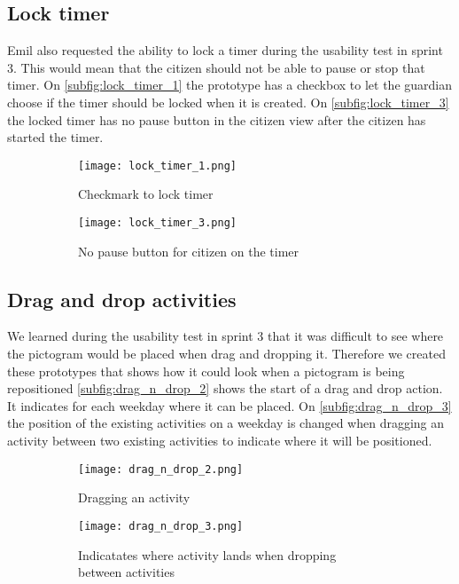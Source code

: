 \subsection{Lock timer}
Emil also requested the ability to lock a timer during the usability test in sprint 3. 
This would mean that the citizen should not be able to pause or stop that timer.
On \autoref{subfig:lock_timer_1} the prototype has a checkbox to let the guardian choose if the timer should be locked when it is created.
On \autoref{subfig:lock_timer_3} the locked timer has no pause button in the citizen view after the citizen has started the timer. 
\begin{figure}[H]
    \begin{subfigure}{0.5\textwidth}
    \texttt{[image: lock\_timer\_1.png]}
    \caption{Checkmark to lock timer}
    \label{subfig:lock_timer_1}
    \end{subfigure}
    \begin{subfigure}{0.5\textwidth}
        \texttt{[image: lock\_timer\_3.png]}
    \caption{No pause button for citizen on the timer}
    \label{subfig:lock_timer_3}
    \end{subfigure} 
    \caption{}
    \label{fig:lock_timer}
\end{figure}

\subsection{Drag and drop activities}
We learned during the usability test in sprint 3 that it was difficult to see where the pictogram would be placed when drag and dropping it.
Therefore we created these prototypes that shows how it could look when a pictogram is being repositioned
\autoref{subfig:drag_n_drop_2} shows the start of a drag and drop action. It indicates for each weekday where it can be placed. 
On \autoref{subfig:drag_n_drop_3} the position of the existing activities on a weekday is changed when dragging an activity between two existing activities to indicate where it will be positioned.
\begin{figure}[H]
    \begin{subfigure}{0.5\textwidth}
    \texttt{[image: drag\_n\_drop\_2.png]}
    \caption{Dragging an activity}
    \label{subfig:drag_n_drop_2}
    \end{subfigure}
    \begin{subfigure}{0.5\textwidth}
        \texttt{[image: drag\_n\_drop\_3.png]}
    \caption{Indicatates where activity lands when dropping between activities}
    \label{subfig:drag_n_drop_3}
    \end{subfigure} 
    \caption{}
    \label{fig:drag_n_drop}
\end{figure}

